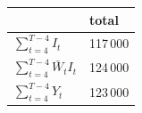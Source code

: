 
\begin{tabular}{ll}
\toprule
  & total\\
\midrule
$\sum_{t = 4}^{T-4} I_t$ & 117\,000\\
$\sum_{t = 4}^{T-4} \bar W_t I_t$ & 124\,000\\
$\sum_{t = 4}^{T-4} Y_t$ & 123\,000\\
\bottomrule
\end{tabular}